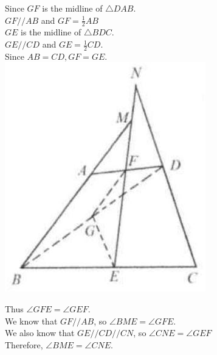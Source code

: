 \documentclass{article}
\begin{document}
Since \(G F\) is the midline of \(\triangle D A B\).\\
\(G F / / A B\) and \(G F=\frac{1}{2} A B\)\\
\(G E\) is the midline of \(\triangle B D C\).\\
\(G E / / C D\) and \(G E=\frac{1}{2} C D\).\\
Since \(A B=C D, G F=G E\).\\
\centering
\includegraphics[width=\textwidth]{images/042.jpg}

Thus \(\angle G F E=\angle G E F\).\\
We know that \(G F / / A B\), so \(\angle B M E=\angle G F E\).\\
We also know that \(G E / / C D / / C N\), so \(\angle C N E=\angle G E F\)\\
Therefore, \(\angle B M E=\angle C N E\).
\end{document}
